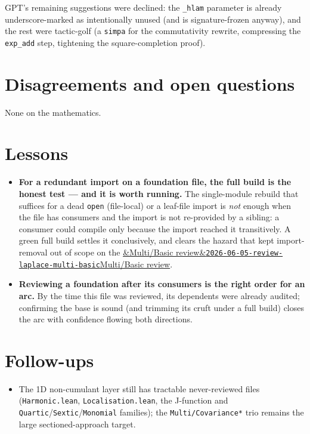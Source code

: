 \documentclass[11pt]{article}
\newcommand{\reviewref}[2][]{\href{https://therisensea.org/reviews/#2/}{\ifx&#1&\texttt{#2}\else#1\fi}}
\begin{document}
GPT's remaining suggestions were declined: the \texttt{\_hlam} parameter is already underscore-marked as
intentionally unused (and is signature-frozen anyway), and the rest were tactic-golf (a \texttt{simpa} for the
commutativity rewrite, compressing the \texttt{exp\_add} step, tightening the square-completion proof).

\section{Disagreements and open questions}
None on the mathematics.

\section{Lessons}
\begin{itemize}[noitemsep]
  \item \textbf{For a redundant import on a foundation file, the full build is the honest test --- and it is
    worth running.} The single-module rebuild that suffices for a dead \texttt{open} (file-local) or a
    leaf-file import is \emph{not} enough when the file has consumers and the import is not re-provided by a
    sibling: a consumer could compile only because the import reached it transitively. A green full build
    settles it conclusively, and clears the hazard that kept import-removal out of scope on the
    \reviewref[Multi/Basic review]{2026-06-05-review-laplace-multi-basic}.
  \item \textbf{Reviewing a foundation after its consumers is the right order for an arc.} By the time this
    file was reviewed, its dependents were already audited; confirming the base is sound (and trimming its
    cruft under a full build) closes the arc with confidence flowing both directions.
\end{itemize}

\section{Follow-ups}
\begin{itemize}[noitemsep]
  \item The 1D non-cumulant layer still has tractable never-reviewed files (\texttt{Harmonic.lean},
    \texttt{Localisation.lean}, the J-function and \texttt{Quartic}/\texttt{Sextic}/\texttt{Monomial} families);
    the \texttt{Multi/Covariance*} trio remains the large sectioned-approach target.
\end{itemize}
\end{document}
